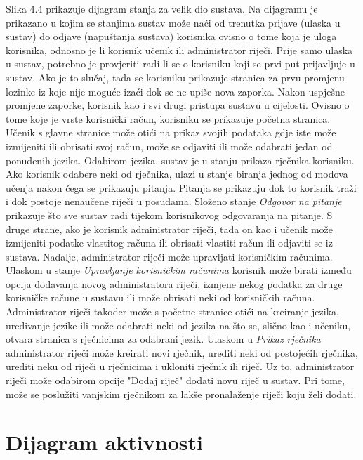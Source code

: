 			Slika 4.4 prikazuje dijagram stanja za velik dio sustava. Na dijagramu je prikazano u kojim se stanjima sustav može naći od trenutka prijave (ulaska u sustav) do odjave (napuštanja sustava) korisnika ovisno o tome koja je uloga korisnika, odnosno je li korisnik učenik ili administrator riječi. Prije samo ulaska u sustav, potrebno je provjeriti radi li se o korisniku koji se prvi put prijavljuje u sustav. Ako je to slučaj, tada se korisniku prikazuje stranica za prvu promjenu lozinke iz koje nije moguće izaći dok se ne upiše nova zaporka. Nakon uspješne promjene zaporke, korisnik kao i svi drugi pristupa sustavu u cijelosti. Ovisno o tome koje je vrste korisnički račun, korisniku se prikazuje početna stranica. Učenik s glavne stranice može otići na prikaz svojih podataka gdje iste može izmijeniti ili obrisati svoj račun, može se odjaviti ili može odabrati jedan od ponuđenih jezika. Odabirom jezika, sustav je u stanju prikaza rječnika korisniku. Ako korisnik odabere neki od rječnika, ulazi u stanje biranja jednog od modova učenja nakon čega se prikazuju pitanja. Pitanja se prikazuju dok to korisnik traži i dok postoje nenaučene riječi u posudama. Složeno stanje \textit{Odgovor na pitanje} prikazuje što sve sustav radi tijekom korisnikovog odgovaranja na pitanje. S druge strane, ako je korisnik administrator riječi, tada on kao i učenik može izmijeniti podatke vlastitog računa ili obrisati vlastiti račun ili odjaviti se iz sustava. Nadalje, administrator riječi može upravljati korisničkim računima. Ulaskom u stanje \textit{Upravljanje korisničkim računima} korisnik može birati između opcija dodavanja novog administratora riječi, izmjene nekog podatka za druge korisničke račune u sustavu ili može obrisati neki od korisničkih računa. Administrator riječi također može s početne stranice otići na kreiranje jezika, uređivanje jezike ili može odabrati neki od jezika na što se, slično kao i učeniku, otvara stranica s rječnicima za odabrani jezik. Ulaskom u \textit{Prikaz rječnika} administrator riječi može kreirati novi rječnik, urediti neki od postojećih rječnika, urediti neku od riječi u rječnicima i ukloniti rječnik ili riječ. Uz to, administrator riječi može odabirom opcije "Dodaj riječ" dodati novu riječ u sustav. Pri tome, može se poslužiti vanjskim rječnikom za lakše pronalaženje riječi koju želi dodati.
			
			\eject 
		
		\section{Dijagram aktivnosti}
			
